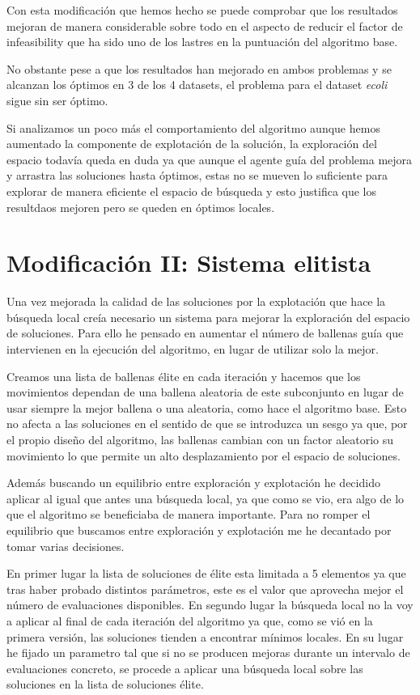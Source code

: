 \documentclass[11pt]{article}
\begin{document}
Con esta modificación que hemos hecho se puede comprobar que los resultados
mejoran de manera considerable sobre todo en el aspecto de reducir el factor de
infeasibility que ha sido uno de los lastres en la puntuación del algoritmo
base. 

No obstante pese a que los resultados han mejorado en ambos problemas y se
alcanzan los óptimos en 3 de los 4 datasets, el problema para el dataset
\textit{ecoli} sigue sin ser óptimo. 

Si analizamos un poco más el comportamiento del algoritmo aunque hemos aumentado
la componente de explotación de la solución, la exploración del espacio todavía
queda en duda ya que aunque el agente guía del problema mejora y arrastra las
soluciones hasta óptimos, estas no se mueven lo suficiente para explorar de
manera eficiente el espacio de búsqueda y esto justifica que los resultdaos
mejoren pero se queden en óptimos locales.

\section{Modificación II: Sistema elitista}

Una vez mejorada la calidad de las soluciones por la explotación que hace la
búsqueda local creía necesario un sistema para mejorar la exploración del
espacio de soluciones. Para ello he pensado en aumentar el número de ballenas
guía que intervienen en la ejecución del algoritmo, en lugar de utilizar solo la
mejor. 

Creamos una lista de ballenas élite en cada iteración y hacemos que los
movimientos dependan de una ballena aleatoria de este subconjunto en lugar de
usar siempre la mejor ballena o una aleatoria, como hace el algoritmo base. Esto
no afecta a las soluciones en el sentido de que se introduzca un sesgo ya que,
por el propio diseño del algoritmo, las ballenas cambian con un factor aleatorio
su movimiento lo que permite un alto desplazamiento por el espacio de
soluciones.

Además buscando un equilibrio entre exploración y explotación he decidido
aplicar al igual que antes una búsqueda local, ya que como se vio, era algo de
lo que el algoritmo se beneficiaba de manera importante. Para no romper el
equilibrio que buscamos entre exploración y explotación me he decantado por 
tomar varias decisiones.

En primer lugar la lista de soluciones de élite esta limitada a 5 elementos ya
que tras haber probado distintos parámetros, este es el valor que aprovecha mejor
el número de evaluaciones disponibles. En segundo lugar la búsqueda local no la
voy a aplicar al final de cada iteración del algoritmo ya que, como se vió en la
primera versión, las soluciones tienden a encontrar mínimos locales. En su lugar
he fijado un parametro tal que si no se producen mejoras durante un intervalo de
evaluaciones concreto, se procede a aplicar una búsqueda local sobre las
soluciones en la lista de soluciones élite.
\end{document}
